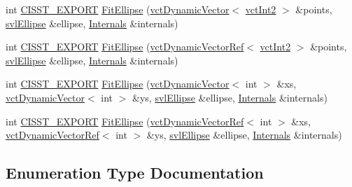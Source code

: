 \begin{DoxyCompactItemize}
\item 
int \hyperlink{cmn_export_macros_8h_a99393e0c3ac434b2605235bbe20684f8}{C\+I\+S\+S\+T\+\_\+\+E\+X\+P\+O\+R\+T} \hyperlink{namespacesvl_image_processing_a4a85afa0bb53375e699868c357452543}{Fit\+Ellipse} (\hyperlink{classvct_dynamic_vector}{vct\+Dynamic\+Vector}$<$ \hyperlink{vct_fixed_size_vector_types_8h_add8c88eb6a432b15f14b866b9c35325f}{vct\+Int2} $>$ \&points, \hyperlink{structsvl_ellipse}{svl\+Ellipse} \&ellipse, \hyperlink{classsvl_image_processing_1_1_internals}{Internals} \&internals)
\item 
int \hyperlink{cmn_export_macros_8h_a99393e0c3ac434b2605235bbe20684f8}{C\+I\+S\+S\+T\+\_\+\+E\+X\+P\+O\+R\+T} \hyperlink{namespacesvl_image_processing_aad9cc4e49aa720ddcee41baf824d9f23}{Fit\+Ellipse} (\hyperlink{classvct_dynamic_vector_ref}{vct\+Dynamic\+Vector\+Ref}$<$ \hyperlink{vct_fixed_size_vector_types_8h_add8c88eb6a432b15f14b866b9c35325f}{vct\+Int2} $>$ \&points, \hyperlink{structsvl_ellipse}{svl\+Ellipse} \&ellipse, \hyperlink{classsvl_image_processing_1_1_internals}{Internals} \&internals)
\item 
int \hyperlink{cmn_export_macros_8h_a99393e0c3ac434b2605235bbe20684f8}{C\+I\+S\+S\+T\+\_\+\+E\+X\+P\+O\+R\+T} \hyperlink{namespacesvl_image_processing_acfdf5370aa634ba4667c30c3bcde4d38}{Fit\+Ellipse} (\hyperlink{classvct_dynamic_vector}{vct\+Dynamic\+Vector}$<$ int $>$ \&xs, \hyperlink{classvct_dynamic_vector}{vct\+Dynamic\+Vector}$<$ int $>$ \&ys, \hyperlink{structsvl_ellipse}{svl\+Ellipse} \&ellipse, \hyperlink{classsvl_image_processing_1_1_internals}{Internals} \&internals)
\item 
int \hyperlink{cmn_export_macros_8h_a99393e0c3ac434b2605235bbe20684f8}{C\+I\+S\+S\+T\+\_\+\+E\+X\+P\+O\+R\+T} \hyperlink{namespacesvl_image_processing_a78eee24a87a52ecc83dc9e68f8b68d9c}{Fit\+Ellipse} (\hyperlink{classvct_dynamic_vector_ref}{vct\+Dynamic\+Vector\+Ref}$<$ int $>$ \&xs, \hyperlink{classvct_dynamic_vector_ref}{vct\+Dynamic\+Vector\+Ref}$<$ int $>$ \&ys, \hyperlink{structsvl_ellipse}{svl\+Ellipse} \&ellipse, \hyperlink{classsvl_image_processing_1_1_internals}{Internals} \&internals)
\end{DoxyCompactItemize}


\subsection{Enumeration Type Documentation}
\hypertarget{namespacesvl_image_processing_a52b75591f8aa2cf8a2b4ea843b2f864a}{}
